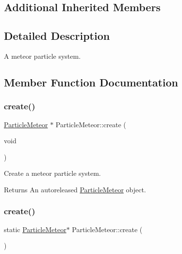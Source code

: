 \subsection*{Additional Inherited Members}


\subsection{Detailed Description}
A meteor particle system. 

\subsection{Member Function Documentation}
\mbox{\label{classParticleMeteor_a57db98f9aa44361bb0dc75e7549885ac}} 
\subsubsection{\texorpdfstring{create()}{create()}\hspace{0.1cm}{\footnotesize\ttfamily [1/2]}}
{\footnotesize\ttfamily \hyperlink{classParticleMeteor}{Particle\+Meteor} $\ast$ Particle\+Meteor\+::create (\begin{DoxyParamCaption}\item[{void}]{ }\end{DoxyParamCaption})\hspace{0.3cm}{\ttfamily [static]}}

Create a meteor particle system.

\begin{DoxyReturn}{Returns}
An autoreleased \hyperlink{classParticleMeteor}{Particle\+Meteor} object. 
\end{DoxyReturn}
\mbox{\label{classParticleMeteor_aa9d11d4fdb67f252edd256bccb576438}} 
\subsubsection{\texorpdfstring{create()}{create()}\hspace{0.1cm}{\footnotesize\ttfamily [2/2]}}
{\footnotesize\ttfamily static \hyperlink{classParticleMeteor}{Particle\+Meteor}$\ast$ Particle\+Meteor\+::create (\begin{DoxyParamCaption}{ }\end{DoxyParamCaption})\hspace{0.3cm}{\ttfamily [static]}}


